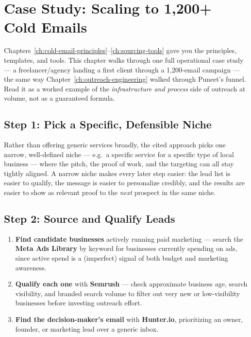 \chapter{Case Study: Scaling to 1,200+ Cold Emails}
\label{ch:case-study-emails}

Chapters~\ref{ch:cold-email-principles}--\ref{ch:sourcing-tools} gave you the principles, templates, and tools.
This chapter walks through one full operational case study — a freelancer/agency landing a first client through
a 1,200-email campaign — the same way Chapter~\ref{ch:outreach-engineering} walked through Puneet's funnel. Read
it as a worked example of the \emph{infrastructure and process} side of outreach at volume, not as a guaranteed
formula.

\section{Step 1: Pick a Specific, Defensible Niche}

Rather than offering generic services broadly, the cited approach picks one narrow, well-defined niche — e.g.\
a specific service for a specific type of local business — where the pitch, the proof of work, and the targeting
can all stay tightly aligned. A narrow niche makes every later step easier: the lead list is easier to qualify,
the message is easier to personalize credibly, and the results are easier to show as relevant proof to the
\emph{next} prospect in the same niche.

\section{Step 2: Source and Qualify Leads}

\begin{enumerate}
  \item \textbf{Find candidate businesses} actively running paid marketing — search the \textbf{Meta Ads
  Library} by keyword for businesses currently spending on ads, since active spend is a (imperfect) signal of
  both budget and marketing awareness.
  \item \textbf{Qualify each one} with \textbf{Semrush} — check approximate business age, search visibility, and
  branded search volume to filter out very new or low-visibility businesses before investing outreach effort.
  \item \textbf{Find the decision-maker's email} with \textbf{Hunter.io}, prioritizing an owner, founder, or
  marketing lead over a generic inbox.
\end{enumerate}

